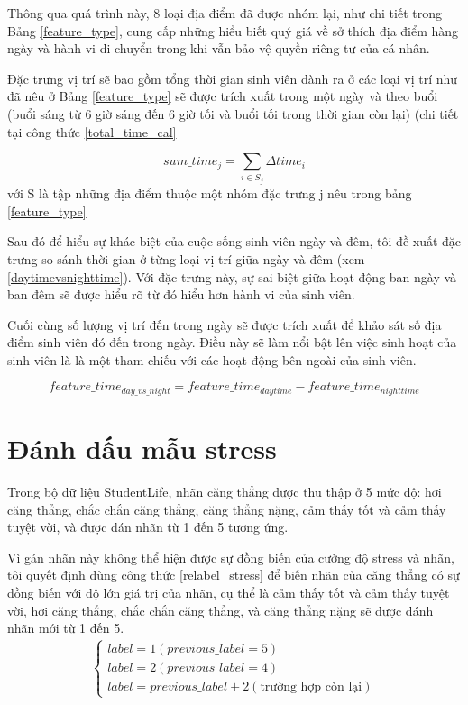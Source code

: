 Thông qua quá trình này, 8 loại địa điểm đã được nhóm lại, như chi tiết trong Bảng \ref{feature_type}, cung cấp những hiểu biết quý giá về sở thích địa điểm hàng ngày và hành vi di chuyển trong khi vẫn bảo vệ quyền riêng tư của cá nhân.

Đặc trưng vị trí sẽ bao gồm tổng thời gian sinh viên dành ra ở các loại vị trí như đã nêu ở Bảng \ref{feature_type} sẽ được trích xuất trong một ngày và theo buổi (buổi sáng từ 6 giờ sáng đến 6 giờ tối và buổi tối trong thời gian còn lại) (chi tiết tại công thức \eqref{total_time_cal}

\begin{equation}
     sum\_time_j=\sum_{i \in S_j}\Delta time_i
    \label{total_time_cal}
\end{equation}
với S là tập những địa điểm thuộc một nhóm đặc trưng j nêu trong bảng \ref{feature_type}

Sau đó để hiểu sự khác biệt của cuộc sống sinh viên ngày và đêm, tôi đề xuất đặc trưng so sánh thời gian ở từng loại vị trí giữa ngày và đêm (xem \eqref{daytimevsnighttime}). Với đặc trưng này, sự sai biệt giữa hoạt động ban ngày và ban đêm sẽ được hiểu rõ từ đó hiểu hơn hành vi của sinh viên.

Cuối cùng số lượng vị trí đến trong ngày sẽ được trích xuất để khảo sát số địa điểm sinh viên đó đến trong ngày. Điều này sẽ làm nổi bật lên việc sinh hoạt của sinh viên là là một tham chiếu với các hoạt động bên ngoài của sinh viên.

\begin{equation}
feature\_time_{day\_vs\_night}=feature\_time_{daytime}-feature\_time_{nighttime}
\label{daytimevsnighttime}
\end{equation}

\section{Đánh dấu mẫu stress}\label{relabel}
Trong bộ dữ liệu StudentLife, nhãn căng thẳng được thu thập ở 5 mức độ: hơi căng thẳng, chắc chắn căng thẳng, căng thẳng nặng, cảm thấy tốt và cảm thấy tuyệt vời, và được dán nhãn từ 1 đến 5 tương ứng.

Vì gán nhãn này không thể hiện được sự đồng biến của cường độ stress và nhãn, tôi quyết định dùng công thức \eqref{relabel_stress} để biến nhãn của căng thẳng có sự đồng biến với độ lớn giá trị của nhãn, cụ thể là cảm thấy tốt và cảm thấy tuyệt vời, hơi căng thẳng, chắc chắn căng thẳng, và căng thẳng nặng sẽ được đánh nhãn mới từ 1 đến 5.
\begin{align}
    \begin{cases}
    label=1 (previous\_label=5)\\
    label=2 (previous\_label=4)\\
    label= previous\_label+2 (\text{trường hợp còn lại})
\end{cases}
\label{relabel_stress}
\end{align}


